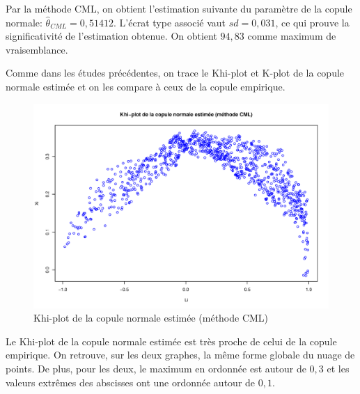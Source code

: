 Par la méthode CML, on obtient l'estimation suivante du paramètre de la copule normale: $\widehat{\theta}_{CML}=0,51412$. L'écrat type associé vaut $sd = 0,031$, ce qui prouve la significativité de l'estimation obtenue. On obtient $94,83$ comme maximum de vraisemblance. 

Comme dans les études précédentes, on trace le Khi-plot et K-plot de la copule normale estimée et on les compare à ceux de la copule empirique.

\noindent%
\begin{figure}[H]
    \begin{center}
      \includegraphics[width=17 cm, angle=0]{./pictures/normalcmlkhiplot.png}
      \centering\caption{\label{2}Khi-plot de la copule normale estimée (méthode CML)}
    \end{center}
\end{figure}

Le Khi-plot de la copule normale estimée est très proche de celui de la copule empirique. On retrouve, sur les deux graphes, la même forme globale du nuage de points. De plus, pour les deux, le maximum en ordonnée est autour de $0,3$ et les valeurs extrêmes des abscisses ont une ordonnée autour de $0,1$. 

